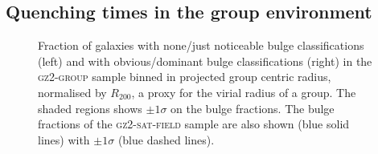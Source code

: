 


\subsection{Quenching times in the group environment}

\begin{figure}
\caption{Fraction of galaxies with none/just noticeable bulge classifications (left) and with obvious/dominant bulge classifications (right) in the \textsc{gz2-group} sample binned in projected group centric radius, normalised by $R_{200}$, a proxy for the virial radius of a group. The shaded regions shows $\pm1\sigma$ on the bulge fractions. The bulge fractions of the \textsc{gz2-sat-field} sample are also shown (blue solid lines) with $\pm1\sigma$ (blue dashed lines).}
\label{fig:bulgeradius}
\end{figure}

